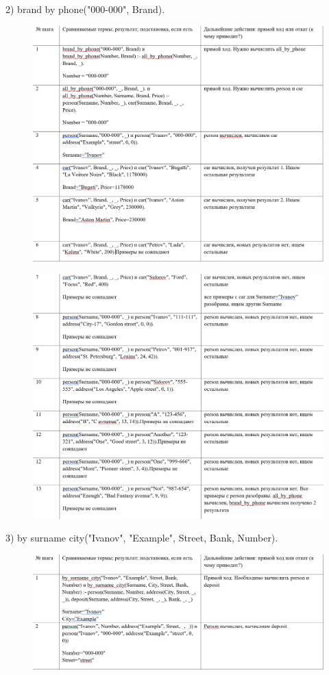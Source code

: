 \documentclass[a4paper, 12pt]{article}
\begin{document}
2) brand by phone("000-000", Brand).

\begin{figure}[h!]
	\centering \includegraphics[scale=0.8]{3.4}
\end{figure}
\clearpage
\newpage
\begin{figure}[h!]
	\centering \includegraphics[scale=0.8]{3.5}
\end{figure}
3) by surname city("Ivanov", "Example", Street, Bank, Number).
\begin{figure}[h!]
	\centering \includegraphics[scale=0.8]{3.6}
\end{figure}
\end{document}
